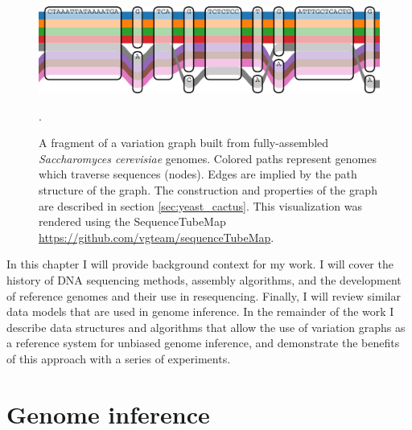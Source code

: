 \begin{figure}[htbp!]
  \centering
  \includegraphics[width=1.0\textwidth]{Chapter1/Figs/vg_tubemap.pdf}
  \caption[A variation graph]{
    A fragment of a variation graph built from fully-assembled \emph{Saccharomyces cerevisiae} genomes.
    Colored paths represent genomes which traverse sequences (nodes).
    Edges are implied by the path structure of the graph.
    The construction and properties of the graph are described in section \ref{sec:yeast_cactus}.
    This visualization was rendered using the SequenceTubeMap \url{https://github.com/vgteam/sequenceTubeMap}.
    } 
\label{fig:pangenomic_processes}.
\end{figure}

In this chapter I will provide background context for my work.
I will cover the history of DNA sequencing methods, assembly algorithms, and the development of reference genomes and their use in resequencing.
Finally, I will review similar data models that are used in genome inference.
In the remainder of the work I describe data structures and algorithms that allow the use of variation graphs as a reference system for unbiased genome inference, and demonstrate the benefits of this approach with a series of experiments.

\section{Genome inference}

